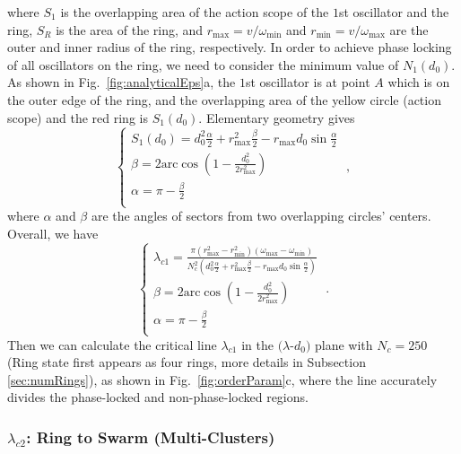 \documentclass[%
 aip,
 amsmath,amssymb,
 reprint,%
]{revtex4-1}
\begin{document}
where $S_1$ is the overlapping area of the action scope of the $1$st oscillator and the ring, $S_R$ is the area of the ring, and $r_{\max}=v/\omega_{\min}$ and $r_{\min}=v/\omega_{\max}$ are the outer and inner radius of the ring, respectively. In order to achieve phase locking of all oscillators on the ring, we need to consider the minimum value of $N_1\left( d_0\right)$. As shown in Fig.~\ref{fig:analyticalEps}a, the $1$st oscillator is at point $A$ which is on the outer edge of the ring, and the overlapping area of the yellow circle (action scope) and the red ring is $S_1\left( d_0 \right)$.  Elementary geometry gives 
\begin{equation}\label{eq:S1}
    \begin{cases}
        S_1\left( d_0 \right) =d_{0}^{2}\frac{\alpha}{2}+r_{\max}^{2}\frac{\beta}{2}-r_{\max}d_0\sin \frac{\alpha}{2}\\
        \beta =2\mathrm{arc}\cos \left( 1-\frac{d_{0}^{2}}{2r_{\max}^{2}} \right)\\
        \alpha =\pi -\frac{\beta}{2}\\
    \end{cases}\;,
\end{equation}
where $\alpha$ and $\beta$ are the angles of sectors from two overlapping circles' centers. Overall, we have
\begin{equation}
    \begin{cases}
        \lambda _{c1}=\frac{\pi \left( r_{\max}^{2}-r_{\min}^{2} \right) \left( \omega _{\max}-\omega _{\min} \right)}{N_{c}^{2}\left( d_{0}^{2}\frac{\alpha}{2}+r_{\max}^{2}\frac{\beta}{2}-r_{\max}d_0\sin \frac{\alpha}{2} \right)}\\
        \beta =2\mathrm{arc}\cos \left( 1-\frac{d_{0}^{2}}{2r_{\max}^{2}} \right)\\
        \alpha =\pi -\frac{\beta}{2}\\
    \end{cases}\;.
\end{equation}
Then we can calculate the critical line $\lambda_{c1}$ in the $(\lambda$-$d_0)$ plane with $N_c=250$ (Ring state first appears as four rings, more details in Subsection \ref{sec:numRings}), as shown in Fig.~\ref{fig:orderParam}c, where the line accurately divides the phase-locked and non-phase-locked regions.

\subsubsection{$\lambda_{c2}$: Ring to Swarm (Multi-Clusters)}
\end{document}
